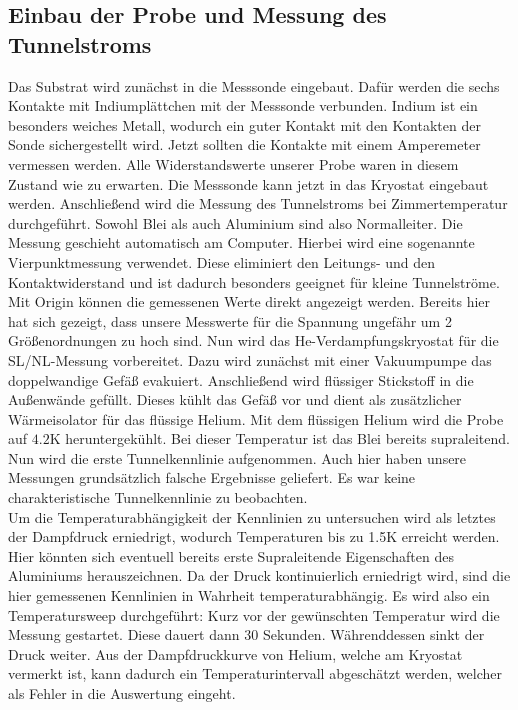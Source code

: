 \documentclass[twoside,        %
               BCOR12mm,       %
               english,ngerman, %
               fleqn,headsepline=false,footsepline=false
              ]{Vorlage/MFPREPORT}
\begin{document}
\subsection{Einbau der Probe und Messung des Tunnelstroms}
Das Substrat wird zunächst in die Messsonde eingebaut. Dafür werden die sechs
Kontakte mit Indiumplättchen mit der Messsonde verbunden. Indium ist ein
besonders weiches Metall, wodurch ein guter Kontakt mit den Kontakten der Sonde
sichergestellt wird. Jetzt sollten die Kontakte mit einem Amperemeter vermessen
werden. Alle Widerstandswerte unserer Probe waren in diesem Zustand wie zu
erwarten.
Die Messsonde kann jetzt in das Kryostat eingebaut werden. Anschließend wird
die Messung des Tunnelstroms bei Zimmertemperatur durchgeführt. Sowohl Blei als
auch Aluminium sind also Normalleiter. Die Messung geschieht automatisch am
Computer. Hierbei wird eine sogenannte Vierpunktmessung verwendet. Diese
eliminiert den Leitungs- und den Kontaktwiderstand und ist dadurch besonders
geeignet für kleine Tunnelströme.
Mit Origin können die gemessenen Werte direkt angezeigt werden.
Bereits hier hat sich gezeigt, dass unsere Messwerte für die Spannung
ungefähr um 2 Größenordnungen zu hoch sind.
Nun wird das He-Verdampfungskryostat für die SL/NL-Messung vorbereitet. Dazu wird zunächst mit einer Vakuumpumpe das doppelwandige Gefäß evakuiert. Anschließend wird flüssiger
Stickstoff in die Außenwände gefüllt. Dieses kühlt das Gefäß vor und dient als
zusätzlicher Wärmeisolator für das flüssige Helium. Mit dem flüssigen Helium
wird die Probe auf $4.2$\;K heruntergekühlt. Bei dieser Temperatur ist das Blei
bereits supraleitend. Nun wird die erste Tunnelkennlinie
aufgenommen. Auch hier haben unsere Messungen grundsätzlich falsche Ergebnisse
geliefert. Es war keine charakteristische Tunnelkennlinie zu beobachten. \\
Um die Temperaturabhängigkeit der Kennlinien zu untersuchen wird als
letztes der Dampfdruck erniedrigt, wodurch Temperaturen bis zu 1.5\;K erreicht
werden. Hier könnten sich eventuell bereits erste Supraleitende Eigenschaften des
Aluminiums herauszeichnen. Da der Druck kontinuierlich erniedrigt wird, sind
die hier gemessenen Kennlinien in Wahrheit temperaturabhängig. Es wird also ein
Temperatursweep durchgeführt: Kurz vor der gewünschten Temperatur wird die
Messung gestartet. Diese dauert dann 30 Sekunden. Währenddessen sinkt der Druck
weiter. Aus der Dampfdruckkurve von Helium, welche am Kryostat vermerkt ist,
kann dadurch ein Temperaturintervall abgeschätzt werden, welcher als Fehler in
die Auswertung eingeht.
\end{document}
